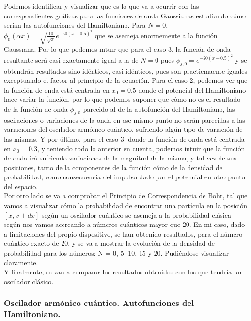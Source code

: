 \documentclass[12pt,paper]{article}
\begin{document}
Podemos identificar y visualizar que es lo que va a ocurrir con las correspondientes gráficas  para las funciones de onda Gaussianas estudiando cómo serían las autofunciones del Hamiltoniano. Para $N = 0$, $\phi_0(\alpha x) = \sqrt{\frac{10}{\sqrt{\pi}}} e^{-50(x-0.5)^2}$ que se asemeja enormemente a la función Gaussiana. Por lo que podemos intuir que para el caso 3, la función de onda resultante será casi exactamente igual a la de $N=0$ pues $\phi_{j,0} = e^{-50(x - 0.5)^2}$ y se obtendrán resultados sino idénticos, casi idénticos, pues son practicmaente iguales exceptuando el factor al principio de la ecuación. Para el caso 2, podemos ver que la función de onda está centrada en $x_0 = 0.5$ donde el potencial del Hamiltoniano hace variar la función, por lo que podemos suponer que cómo no es el resultado de la función de onda $\phi_{j,0}$ parecido al de la autofunción del Hamiltoniano, las oscilaciones o variaciones de la onda en ese mismo punto no serán parecidas a las variaciones del oscilador armónico cuántico, sufriendo algún tipo de variación de las mismas. Y por último, para el caso 3, donde la función de onda está centrada en $x_0 = 0.3$, y teniendo todo lo anterior en cuenta, podemos intuir que la función de onda irá sufriendo variaciones de la magnitud de la misma, y tal vez de sus posiciones, tanto de la componentes de la función cómo de la densidad de probabilidad, como consecuencia del impulso dado por el potencial en otro punto del espacio.\\

Por otro lado se va a comprobar el Principio de Correspondencia de Bohr, tal que vamos a visualizar cómo la probabilidad de encontrar una partícula en la posición $[x, x+dx]$ según un oscilador cuántico se asemeja a la probabilidad clásica según nos vamos acercando a números cuánticos mayor que 20. En mi caso, dado a limitaciones del propio dispositivo, se han obtenido resultados, para el número cuántico exacto de 20, y se va a mostrar la evolución de la densidad de probabilidad para los números: N = 0, 5, 10, 15 y 20. Pudiéndose visualizar claramente.\\

Y finalmente, se van a comparar los resultados obtenidos con los que tendría un oscilador clásico.

\subsubsection{Oscilador armónico cuántico. Autofunciones del Hamiltoniano.}
\end{document}
